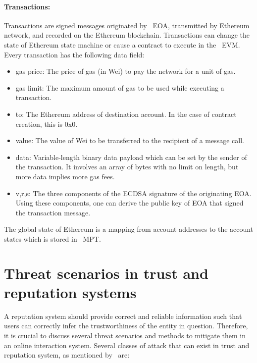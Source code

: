 \paragraph{Transactions:}Transactions are signed messages originated by
~\ac{EOA}, transmitted by Ethereum network, and recorded on the Ethereum
blockchain. Transactions can change the state of Ethereum state machine or
cause a contract to execute in the ~\ac{EVM}. Every transaction has the
following data field:   
\begin{itemize}
	\item gas price: The price of gas (in Wei) to pay the network for a unit of
		gas. 
	\item gas limit: The maximum amount of gas to be used while executing a
		transaction.
	\item to: The Ethereum address of destination account. In the case of
		contract creation, this is 0x0. 
	\item value: The value of Wei to be transferred to the recipient of a
		message call.
	\item data: Variable-length binary data payload which can be set by the
		sender of the transaction. It involves an array of bytes with no limit
		on length, but more data implies more gas fees. 
	\item v,r,s: The three components of the ECDSA signature of the originating
		\ac{EOA}. Using these components, one can derive the public key of
		\ac{EOA} that signed the transaction message.  
\end{itemize}
The global state of Ethereum is a mapping from account addresses to the account
states which is stored in ~\ac{MPT}.



\section{Threat scenarios in trust and reputation systems}
A reputation system should provide correct and reliable information such that
users can correctly infer the trustworthiness of the entity in question.
Therefore, it is crucial to discuss several threat scenarios and methods to
mitigate them in an online interaction system. Several classes of attack that
can exist in trust and reputation system, as mentioned
by~\cite{hoffman2009survey,marmol2009security} are:  
